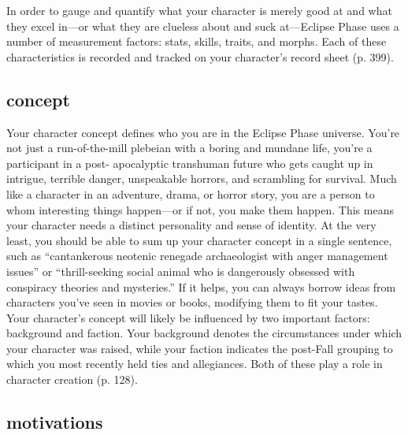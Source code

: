 In order to gauge and quantify what your character is merely good at
and what they excel in—or what they are clueless about and suck
at—Eclipse Phase uses a number of measurement factors: stats, skills,
traits, and morphs. Each of these characteristics is recorded and
tracked on your character's record sheet (p. 399).

\subsection{concept}
\label{sec:concept}

Your character concept defines who you are in the Eclipse Phase
universe. You're not just a run-of-the-mill plebeian with a boring and
mundane life, you're a participant in a post- apocalyptic transhuman
future who gets caught up in intrigue, terrible danger, unspeakable
horrors, and scrambling for survival. Much like a character in an
adventure, drama, or horror story, you are a person to whom
interesting things happen—or if not, you make them happen. This means
your character needs a distinct personality and sense of identity. At
the very least, you should be able to sum up your character concept in
a single sentence, such as “cantankerous neotenic renegade
archaeologist with anger management issues” or “thrill-seeking social
animal who is dangerously obsessed with conspiracy theories and
mysteries.” If it helps, you can always borrow ideas from characters
you've seen in movies or books, modifying them to fit your tastes.
Your character's concept will likely be influenced by two important
factors: background and faction. Your background denotes the
circumstances under which your character was raised, while your
faction indicates the post-Fall grouping to which you most recently
held ties and allegiances.  Both of these play a role in character
creation (p. 128).

\subsection{motivations}
\label{sec:motivations}

